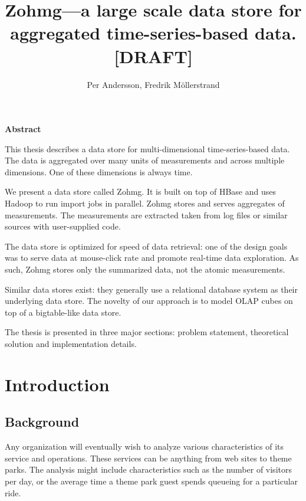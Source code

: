 \documentclass[a4paper,10pt]{book}
\author{Per Andersson, Fredrik M{\"o}llerstrand}
\title{Zohmg---a large scale data store for aggregated time-series-based
data. [DRAFT]}
\begin{document}
\maketitle

\noindent \Large{\textbf{Abstract}}

\vspace{12pt}

\noindent

This thesis describes a data store for multi-dimensional time-series-based
data. The data is aggregated over many units of measurements and across
multiple dimensions. One of these dimensions is always time.

We present a data store called Zohmg. It is built on top of HBase and uses
Hadoop to run import jobs in parallel. Zohmg stores and serves aggregates of
measurements. The measurements are extracted taken from log files or similar
sources with user-supplied code.

The data store is optimized for speed of data retrieval: one of the design
goals was to serve data at mouse-click rate and promote real-time data
exploration. As such, Zohmg stores only the summarized data, not the atomic
measurements.

Similar data stores exist: they generally use a relational database system as
their underlying data store. The novelty of our approach is to model OLAP
cubes on top of a bigtable-like data store.

The thesis is presented in three major sections: problem statement,
theoretical solution and implementation details.


\tableofcontents

\vfill

\pagebreak

\chapter{Introduction}

\section{Background}

Any organization will eventually wish to analyze various characteristics of
its service and operations. These services can be anything from web sites to
theme parks. The analysis might include characteristics such as the number of
visitors per day, or the average time a theme park guest spends queueing for a
particular ride.
\end{document}
